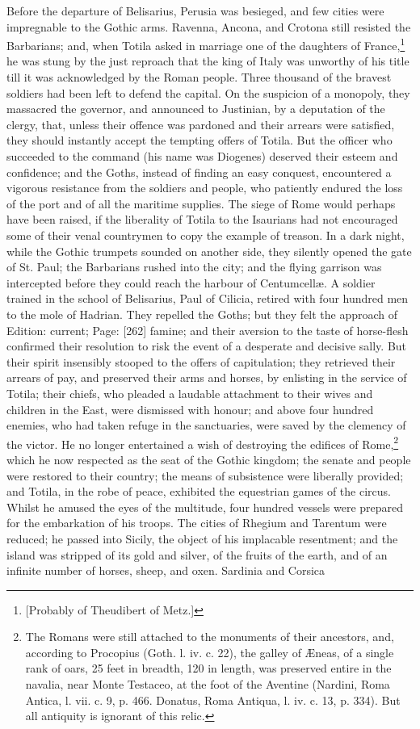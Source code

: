 Before the departure of Belisarius, Perusia was besieged, and few cities were impregnable to the Gothic arms. Ravenna, Ancona, and Crotona still resisted the Barbarians; and, when Totila asked in marriage one of the daughters of France,\footnote{[Probably of Theudibert of Metz.]} he was stung by the just reproach that the king of Italy was unworthy of his title till it was acknowledged by the Roman people. Three thousand of the bravest soldiers had been left to defend the capital. On the suspicion of a monopoly, they massacred the governor, and announced to Justinian, by a deputation of the clergy, that, unless their offence was pardoned and their arrears were satisfied, they should instantly accept the tempting offers of Totila. But the officer who succeeded to the command (his name was Diogenes) deserved their esteem and confidence; and the Goths, instead of finding an easy conquest, encountered a vigorous resistance from the soldiers and people, who patiently endured the loss of the port and of all the maritime supplies. The siege of Rome would perhaps have been raised, if the liberality of Totila to the Isaurians had not encouraged some of their venal countrymen to copy the example of treason. In a dark night, while the Gothic trumpets sounded on another side, they silently opened the gate of St. Paul; the Barbarians rushed into the city; and the flying garrison was intercepted before they could reach the harbour of Centumcellæ. A soldier trained in the school of Belisarius, Paul of Cilicia, retired with four hundred men to the mole of Hadrian. They repelled the Goths; but they felt the approach of Edition: current; Page: [262] famine; and their aversion to the taste of horse-flesh confirmed their resolution to risk the event of a desperate and decisive sally. But their spirit insensibly stooped to the offers of capitulation; they retrieved their arrears of pay, and preserved their arms and horses, by enlisting in the service of Totila; their chiefs, who pleaded a laudable attachment to their wives and children in the East, were dismissed with honour; and above four hundred enemies, who had taken refuge in the sanctuaries, were saved by the clemency of the victor. He no longer entertained a wish of destroying the edifices of Rome,\footnote{The Romans were still attached to the monuments of their ancestors, and, according to Procopius (Goth. l. iv. c. 22), the galley of Æneas, of a single rank of oars, 25 feet in breadth, 120 in length, was preserved entire in the navalia, near Monte Testaceo, at the foot of the Aventine (Nardini, Roma Antica, l. vii. c. 9, p. 466. Donatus, Roma Antiqua, l. iv. c. 13, p. 334). But all antiquity is ignorant of this relic.} which he now respected as the seat of the Gothic kingdom; the senate and people were restored to their country; the means of subsistence were liberally provided; and Totila, in the robe of peace, exhibited the equestrian games of the circus. Whilst he amused the eyes of the multitude, four hundred vessels were prepared for the embarkation of his troops. The cities of Rhegium and Tarentum were reduced; he passed into Sicily, the object of his implacable resentment; and the island was stripped of its gold and silver, of the fruits of the earth, and of an infinite number of horses, sheep, and oxen. Sardinia and Corsica 
